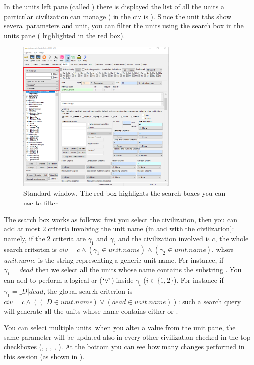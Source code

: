 \begin{appendices}
    In the units left pane (called ) there is displayed the list of all the units a particular civilization can manage (\eg{} in  the civ is ). Since the unit tabs show several parameters and unit, you can filter the units using the search box in the units pane (\eg{}  highlighted in the red box).

    \begin{figure}[ht]
        \centering
        \includegraphics[width=0.7\textwidth]{src/images/genie02}
        \caption{Standard \genie{} window. The red box highlights the search boxes you can use to filter }
        \label{fig:genie02}
    \end{figure}

    The search box works as follows: first you select the civilization, then you can add at most 2 criteria involving the unit name (in and with the civilization): namely, if the 2 criteria are $\gamma_1$ and $\gamma_2$ and the civilization involved is $c$, the whole search criterion is $civ = c \land (\gamma_1 \in unit.name) \land (\gamma_2 \in unit.name)$, where $unit.name$ is the string representing a generic unit name. For instance, if $\gamma_{1} = dead$ then we select all the units whose name contains the substring . You can add \dquote{|} to perform a logical or ($\squote{\lor}$) inside $\gamma_{i}$ ($i \in \{1,2\}$). For instance if $\gamma_{1} = \_D|dead$, the global search criterion is $civ = c \land ((\_D \in unit.name) \lor (dead \in unit.name))$: such a search query will generate all the units whose name contains either  or .

    You can select multiple units: when you alter a value from the unit pane, the same parameter will be updated also in every other civilization checked in the top checkboxes (\eg{}, , , , ). At the bottom you can see how many changes performed in this session (as shown in ).


\end{appendices}
